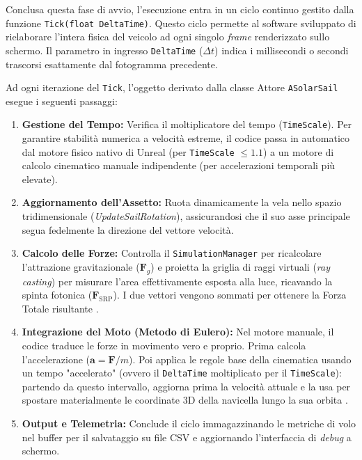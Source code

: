 Conclusa questa fase di avvio, l'esecuzione entra in un ciclo continuo gestito dalla funzione \lstinline|Tick(float DeltaTime)|. Questo ciclo permette al software sviluppato di rielaborare l'intera fisica del veicolo ad ogni singolo \textit{frame} renderizzato sullo schermo. Il parametro in ingresso \lstinline|DeltaTime| ($\Delta t$) indica i millisecondi o secondi trascorsi esattamente dal fotogramma precedente.

Ad ogni iterazione del \lstinline|Tick|, l'oggetto derivato dalla classe Attore \lstinline|ASolarSail| esegue i seguenti passaggi:

\begin{enumerate}
    \item \textbf{Gestione del Tempo:} Verifica il moltiplicatore del tempo (\lstinline|TimeScale|). Per garantire stabilità numerica a velocità estreme, il codice passa in automatico dal motore fisico nativo di Unreal (per \lstinline|TimeScale| $\le 1.1$) a un motore di calcolo cinematico manuale indipendente (per accelerazioni temporali più elevate).
    \item \textbf{Aggiornamento dell'Assetto:} Ruota dinamicamente la vela nello spazio tridimensionale (\textit{UpdateSailRotation}), assicurandosi che il suo asse principale segua fedelmente la direzione del vettore velocità.
    \item \textbf{Calcolo delle Forze:} Controlla il \lstinline|SimulationManager| per ricalcolare l'attrazione gravitazionale ($\mathbf{F}_g$) e proietta la griglia di raggi virtuali (\textit{ray casting}) per misurare l'area effettivamente esposta alla luce, ricavando la spinta fotonica ($\mathbf{F}_{\text{SRP}}$). I due vettori vengono sommati per ottenere la Forza Totale risultante \cite{simo2016realistic}.
    \item \textbf{Integrazione del Moto (Metodo di Eulero):} Nel motore manuale, il codice traduce le forze in movimento vero e proprio. Prima calcola l'accelerazione ($\mathbf{a} = \mathbf{F}/m$). Poi applica le regole base della cinematica usando un tempo "accelerato" (ovvero il \lstinline|DeltaTime| moltiplicato per il \lstinline|TimeScale|): partendo da questo intervallo, aggiorna prima la velocità attuale e la usa per spostare materialmente le coordinate 3D della navicella lungo la sua orbita \cite{curtis2005orbital}.
    \item \textbf{Output e Telemetria:} Conclude il ciclo immagazzinando le metriche di volo nel buffer per il salvataggio su file CSV e aggiornando l'interfaccia di \textit{debug} a schermo.
\end{enumerate}


